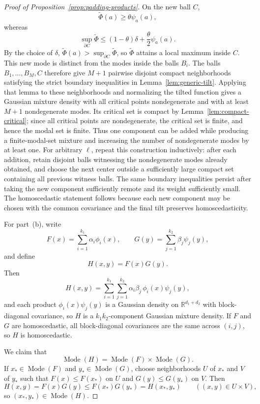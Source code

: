 \documentclass[11pt]{article}
\theoremstyle{plain}
\theoremstyle{definition}
\theoremstyle{remark}
\numberwithin{equation}{section}
\DeclareMathOperator{\Mode}{Mode}
\newcommand{\R}{\mathbb{R}}
\begin{document}
\begin{proof}[Proof of Proposition~\ref{prop:padding-products}]
On the new ball $C$,
\[
\widetilde\Phi(a)\ge \theta\psi_a(a),
\]
whereas
\[
\sup_{\partial C}\widetilde\Phi
\le (1-\theta)\delta+\frac{\theta}{2}\psi_a(a).
\]
By the choice of $\delta$, $\widetilde\Phi(a)>\sup_{\partial C}\widetilde\Phi$, so $\widetilde\Phi$ attains a local maximum inside $C$. This new mode is distinct from the modes inside the balls $B_i$. The balls $B_1,\dots,B_M,C$ therefore give $M+1$ pairwise disjoint compact neighborhoods satisfying the strict boundary inequalities in Lemma~\ref{lem:generic-tilt}. Applying that lemma to these neighborhoods and normalizing the tilted function gives a Gaussian mixture density with all critical points nondegenerate and with at least $M+1$ nondegenerate modes. Its critical set is compact by Lemma~\ref{lem:compact-critical}; since all critical points are nondegenerate, the critical set is finite, and hence the modal set is finite. Thus one component can be added while producing a finite-modal-set mixture and increasing the number of nondegenerate modes by at least one. For arbitrary $\ell$, repeat this construction inductively: after each addition, retain disjoint balls witnessing the nondegenerate modes already obtained, and choose the next center outside a sufficiently large compact set containing all previous witness balls. The same boundary inequalities persist after taking the new component sufficiently remote and its weight sufficiently small. The homoscedastic statement follows because each new component may be chosen with the common covariance and the final tilt preserves homoscedasticity.

For part~(b), write
\[
F(x)=\sum_{i=1}^{k_1}\alpha_i\phi_i(x),
\qquad
G(y)=\sum_{j=1}^{k_2}\beta_j\psi_j(y),
\]
and define
\[
H(x,y)=F(x)G(y).
\]
Then
\[
H(x,y)=\sum_{i=1}^{k_1}\sum_{j=1}^{k_2}\alpha_i\beta_j\,\phi_i(x)\psi_j(y),
\]
and each product $\phi_i(x)\psi_j(y)$ is a Gaussian density on $\R^{d_1+d_2}$ with block-diagonal covariance, so $H$ is a $k_1k_2$-component Gaussian mixture density. If $F$ and $G$ are homoscedastic, all block-diagonal covariances are the same across $(i,j)$, so $H$ is homoscedastic.

We claim that
\[
\Mode(H)=\Mode(F)\times\Mode(G).
\]
If $x_\ast\in\Mode(F)$ and $y_\ast\in\Mode(G)$, choose neighborhoods $U$ of $x_\ast$ and $V$ of $y_\ast$ such that $F(x)\le F(x_\ast)$ on $U$ and $G(y)\le G(y_\ast)$ on $V$. Then
\[
H(x,y)=F(x)G(y)\le F(x_\ast)G(y_\ast)=H(x_\ast,y_\ast)
\qquad ((x,y)\in U\times V),
\]
so $(x_\ast,y_\ast)\in\Mode(H)$.


\end{proof}
\end{document}

